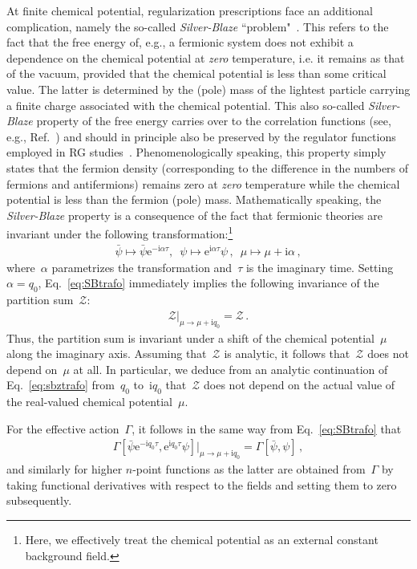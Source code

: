 \documentclass[prd,english,preprintnumbers,amsmath,amssymb,nofootinbib,twocolumn,superscriptaddress]{revtex4-1}
\newcommand{\E}{\mathrm{e}}
\newcommand{\I}{\mathrm{i}}
\newcommand{\be}{\begin{eqnarray}}
\newcommand{\ee}{\end{eqnarray}}
\newcommand{\psib}{\bar{\psi}}
\begin{document}
{{At finite chemical potential, regularization prescriptions face an additional complication, 
namely the so-called {\it Silver-Blaze} ``problem"~\cite{Cohen:2003kd}. This refers to
the fact that the free energy of, e.g., a fermionic system does not exhibit a dependence on the 
chemical potential at {\it zero} temperature, 
i.e. it remains as that of the vacuum, provided that the chemical potential is less than some critical value. The latter is determined
by the (pole) mass of the {lightest particle carrying a} finite charge associated with the chemical potential. This also so-called {\it Silver-Blaze} property 
of the free energy carries over to the {correlation functions (see, e.g., Ref.~\cite{Marko:2014hea}) and 
should in principle {also be preserved}
by the regulator functions employed
in RG studies~\cite{Fu:2015naa,Khan:2015puu}. Phenomenologically} speaking, this property 
simply states that the fermion density (corresponding to the difference in the numbers
of fermions and antifermions) remains zero at {\it zero} temperature while the chemical
potential is less than the fermion (pole) mass.
Mathematically speaking, the {\it Silver-Blaze} property is a consequence of the fact that fermionic theories
are invariant under the following transformation:\footnote{Here, we effectively treat the chemical potential as an external
constant background field.}
%
\be
\psib \mapsto  \psib \E^{-\I \alpha \tau}, \enspace \psi\mapsto \E^{ \I \alpha\tau} \psi\,, \enspace \mu \mapsto \mu + \I\alpha\,,
\label{eq:SBtrafo}
\ee
%
where~$\alpha$ parametrizes the transformation and~$\tau$
is the imaginary time. Setting~$\alpha=q_0$, Eq.~\eqref{eq:SBtrafo} 
immediately implies the following invariance of the partition sum~$\mathcal Z$:
%
\be
{\mathcal Z}\Big|_{\mu \to \mu + \I q_0} = {\mathcal Z}\,.\label{eq:sbztrafo}
\ee
%
Thus, the partition sum is invariant under a shift of the chemical potential~$\mu$
along the imaginary axis. Assuming that~$\mathcal Z$ is analytic, it follows 
that~$\mathcal Z$ does not depend on~$\mu$ at all. In particular, we deduce
from an analytic continuation
of Eq.~\eqref{eq:sbztrafo} from~$q_0$ to~$\I q_0$
that~$\mathcal Z$ does not depend on the actual value of the real-valued
chemical potential~$\mu$.

For the effective action~$\Gamma$, it follows in the same way from Eq.~\eqref{eq:SBtrafo} that
\be
\Gamma[ \bar{\psi} \E^{-\I q_0 \tau},\E^{ \I q_0\tau} \psi ]\Big|_{\mu \to \mu + \I q_0}  = \Gamma[\bar{\psi},\psi]\,,\label{eq:Grel}
\ee
%
and similarly for higher $n$-point functions as the latter are obtained from~$\Gamma$ by taking functional derivatives with respect to the fields
and setting them to zero subsequently. 

}}
\end{document}
